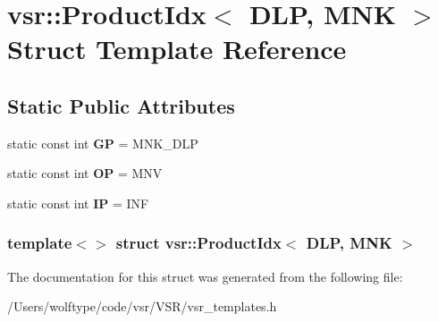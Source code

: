 \hypertarget{structvsr_1_1_product_idx_3_01_d_l_p_00_01_m_n_k_01_4}{\section{vsr\-:\-:Product\-Idx$<$ D\-L\-P, M\-N\-K $>$ Struct Template Reference}
\label{structvsr_1_1_product_idx_3_01_d_l_p_00_01_m_n_k_01_4}
}
\subsection*{Static Public Attributes}
\begin{DoxyCompactItemize}
\item 
\hypertarget{structvsr_1_1_product_idx_3_01_d_l_p_00_01_m_n_k_01_4_a5edb4ef65dda230c40b0cf4cfdcbd15e}{static const int {\bfseries G\-P} = M\-N\-K\-\_\-\-D\-L\-P}\label{structvsr_1_1_product_idx_3_01_d_l_p_00_01_m_n_k_01_4_a5edb4ef65dda230c40b0cf4cfdcbd15e}

\item 
\hypertarget{structvsr_1_1_product_idx_3_01_d_l_p_00_01_m_n_k_01_4_a646d1a540d782b51d52415c8e248d274}{static const int {\bfseries O\-P} = M\-N\-V}\label{structvsr_1_1_product_idx_3_01_d_l_p_00_01_m_n_k_01_4_a646d1a540d782b51d52415c8e248d274}

\item 
\hypertarget{structvsr_1_1_product_idx_3_01_d_l_p_00_01_m_n_k_01_4_adede50a7e169e564334f46b786b5d68a}{static const int {\bfseries I\-P} = I\-N\-F}\label{structvsr_1_1_product_idx_3_01_d_l_p_00_01_m_n_k_01_4_adede50a7e169e564334f46b786b5d68a}

\end{DoxyCompactItemize}
\subsubsection*{template$<$$>$ struct vsr\-::\-Product\-Idx$<$ D\-L\-P, M\-N\-K $>$}



The documentation for this struct was generated from the following file\-:\begin{DoxyCompactItemize}
\item 
/\-Users/wolftype/code/vsr/\-V\-S\-R/vsr\-\_\-templates.\-h\end{DoxyCompactItemize}
